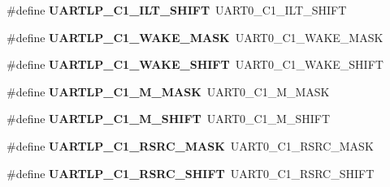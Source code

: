 \begin{DoxyCompactItemize}
\item 
\hypertarget{group___backward___compatibility___symbols_ga337530c2b176d78ca6c28da4ab325783}{}\#define {\bfseries U\+A\+R\+T\+L\+P\+\_\+\+C1\+\_\+\+I\+L\+T\+\_\+\+S\+H\+I\+F\+T}~U\+A\+R\+T0\+\_\+\+C1\+\_\+\+I\+L\+T\+\_\+\+S\+H\+I\+F\+T\label{group___backward___compatibility___symbols_ga337530c2b176d78ca6c28da4ab325783}

\item 
\hypertarget{group___backward___compatibility___symbols_ga2e69313a76db1ef757860afafa047a76}{}\#define {\bfseries U\+A\+R\+T\+L\+P\+\_\+\+C1\+\_\+\+W\+A\+K\+E\+\_\+\+M\+A\+S\+K}~U\+A\+R\+T0\+\_\+\+C1\+\_\+\+W\+A\+K\+E\+\_\+\+M\+A\+S\+K\label{group___backward___compatibility___symbols_ga2e69313a76db1ef757860afafa047a76}

\item 
\hypertarget{group___backward___compatibility___symbols_ga4ca5a7f2cdef379d91da768a34275930}{}\#define {\bfseries U\+A\+R\+T\+L\+P\+\_\+\+C1\+\_\+\+W\+A\+K\+E\+\_\+\+S\+H\+I\+F\+T}~U\+A\+R\+T0\+\_\+\+C1\+\_\+\+W\+A\+K\+E\+\_\+\+S\+H\+I\+F\+T\label{group___backward___compatibility___symbols_ga4ca5a7f2cdef379d91da768a34275930}

\item 
\hypertarget{group___backward___compatibility___symbols_gaf7b253cfe0dae018953b5a5f7e696beb}{}\#define {\bfseries U\+A\+R\+T\+L\+P\+\_\+\+C1\+\_\+\+M\+\_\+\+M\+A\+S\+K}~U\+A\+R\+T0\+\_\+\+C1\+\_\+\+M\+\_\+\+M\+A\+S\+K\label{group___backward___compatibility___symbols_gaf7b253cfe0dae018953b5a5f7e696beb}

\item 
\hypertarget{group___backward___compatibility___symbols_ga7f948b34e2c66421e265c5d499e87db6}{}\#define {\bfseries U\+A\+R\+T\+L\+P\+\_\+\+C1\+\_\+\+M\+\_\+\+S\+H\+I\+F\+T}~U\+A\+R\+T0\+\_\+\+C1\+\_\+\+M\+\_\+\+S\+H\+I\+F\+T\label{group___backward___compatibility___symbols_ga7f948b34e2c66421e265c5d499e87db6}

\item 
\hypertarget{group___backward___compatibility___symbols_gaa53951441e58bf423d327892a23aa074}{}\#define {\bfseries U\+A\+R\+T\+L\+P\+\_\+\+C1\+\_\+\+R\+S\+R\+C\+\_\+\+M\+A\+S\+K}~U\+A\+R\+T0\+\_\+\+C1\+\_\+\+R\+S\+R\+C\+\_\+\+M\+A\+S\+K\label{group___backward___compatibility___symbols_gaa53951441e58bf423d327892a23aa074}

\item 
\hypertarget{group___backward___compatibility___symbols_ga4edf9821b67824b0fdd4931c27ce452d}{}\#define {\bfseries U\+A\+R\+T\+L\+P\+\_\+\+C1\+\_\+\+R\+S\+R\+C\+\_\+\+S\+H\+I\+F\+T}~U\+A\+R\+T0\+\_\+\+C1\+\_\+\+R\+S\+R\+C\+\_\+\+S\+H\+I\+F\+T\label{group___backward___compatibility___symbols_ga4edf9821b67824b0fdd4931c27ce452d}


\end{DoxyCompactItemize}
